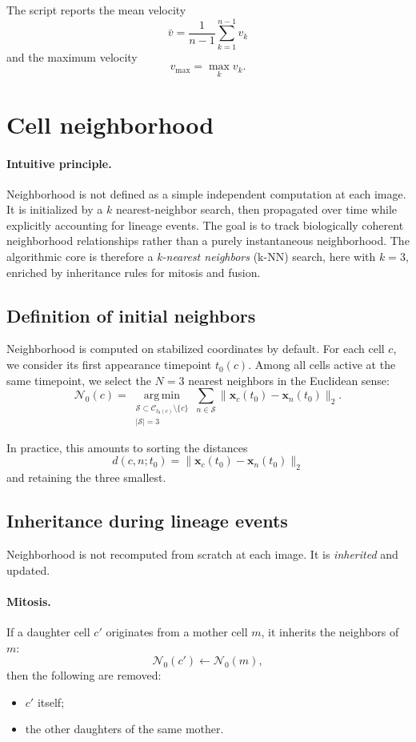 \documentclass[11pt,a4paper]{article}
\begin{document}
The script reports the mean velocity
\[
\bar{v}=\frac{1}{n-1}\sum_{k=1}^{n-1} v_k
\]
and the maximum velocity
\[
v_{\max}=\max_k v_k.
\]

\section{Cell neighborhood}

\paragraph{Intuitive principle.}
Neighborhood is not defined as a simple independent computation at each image. It is initialized by a $k$ nearest-neighbor search, then propagated over time while explicitly accounting for lineage events. The goal is to track biologically coherent neighborhood relationships rather than a purely instantaneous neighborhood. The algorithmic core is therefore a \emph{k-nearest neighbors} (k-NN) search, here with $k=3$, enriched by inheritance rules for mitosis and fusion.

\subsection{Definition of initial neighbors}

Neighborhood is computed on stabilized coordinates by default. For each cell $c$, we consider its first appearance timepoint $t_0(c)$. Among all cells active at the same timepoint, we select the $N=3$ nearest neighbors in the Euclidean sense:
\[
\mathcal{N}_0(c)=
\operatorname*{arg\,min}_{\substack{\mathcal{S}\subset \mathcal{C}_{t_0(c)}\setminus\{c\}\\|\mathcal{S}|=3}}
\sum_{n\in\mathcal{S}}
\|\mathbf{x}_c(t_0)-\mathbf{x}_n(t_0)\|_2.
\]

In practice, this amounts to sorting the distances
\[
d(c,n;t_0)=\|\mathbf{x}_c(t_0)-\mathbf{x}_n(t_0)\|_2
\]
and retaining the three smallest.

\subsection{Inheritance during lineage events}

Neighborhood is not recomputed from scratch at each image. It is \emph{inherited} and updated.

\paragraph{Mitosis.}
If a daughter cell $c'$ originates from a mother cell $m$, it inherits the neighbors of $m$:
\[
\mathcal{N}_0(c') \leftarrow \mathcal{N}_0(m),
\]
then the following are removed:
\begin{itemize}
  \item $c'$ itself;
  \item the other daughters of the same mother.
\end{itemize}
\end{document}
